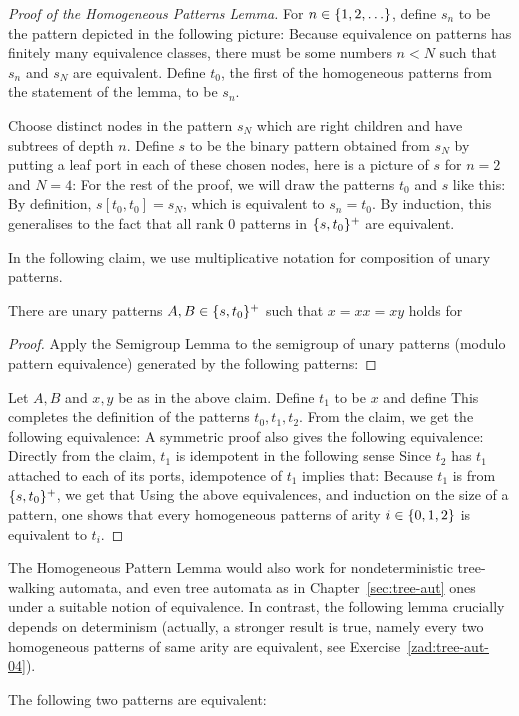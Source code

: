 \begin{proof}[Proof of the Homogeneous Patterns Lemma] For $n \in \{1,2,\ldots\}$, define $s_n$ to be the pattern depicted in the following picture:
Because equivalence on patterns has finitely many equivalence classes, there must be some numbers $n < N$ such that $s_n$ and $s_N$ are equivalent.   Define $t_0$, the first of the homogeneous patterns from the statement of the lemma, to be $s_n$. 

Choose distinct nodes  in the pattern $s_N$ which are right children  and  have subtrees of depth $n$. 
Define $s$ to be the binary  pattern obtained from $s_N$ by putting a leaf port in each of these chosen nodes, here is a picture of $s$ for $n=2$ and $N=4$:
For the rest of the proof, we will draw the patterns $t_0$ and $s$ like this:
By definition, $s[t_0,t_0]=s_N$, which is equivalent to $s_n=t_0$. By induction, this generalises to the fact that  all rank $0$ patterns in $\{s,t_0\}^+$ are equivalent. 

In the following claim, we use multiplicative notation for composition of unary patterns.

\begin{claim}\label{claim:twa1}
	There are unary patterns $A,B \in \{s,t_0\}^+$ such that $
  x = xx = xy$  holds for 
\end{claim}
\begin{proof}
Apply the Semigroup Lemma to the  semigroup of unary patterns (modulo pattern equivalence)  generated by the following patterns:
\end{proof}

Let $A,B$ and $x,y$ be as in the above claim. Define $t_1$ to be $x$ and define
This completes the definition of the patterns $t_0,t_1,t_2$. 
From the claim, we get the following equivalence: 
A symmetric proof also gives the following equivalence:
Directly from the claim, $t_1$ is idempotent in the following sense
Since $t_2$ has $t_1$  attached to  each of its ports,  idempotence of $t_1$ implies that:
Because $t_1$ is from $\{s,t_0\}^+$, we get that
 Using the above equivalences, and induction on the size of a pattern, one shows that every homogeneous patterns of arity $i \in \{0,1,2\}$ is equivalent to $t_i$.
\end{proof}
The  Homogeneous  Pattern Lemma would also work for nondeterministic tree-walking automata, and even tree automata as in Chapter~\ref{sec:tree-aut} ones under a suitable notion of equivalence. In contrast, the following lemma crucially depends on determinism (actually, a stronger result is true, namely every two homogeneous patterns of same arity are equivalent, see Exercise~\ref{zad:tree-aut-04}).
\begin{lemma}
The following two patterns are equivalent:
\end{lemma}

